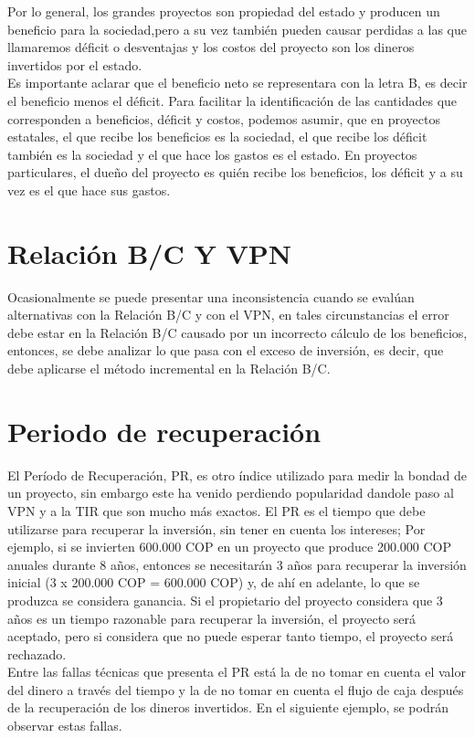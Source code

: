 Por lo general, los grandes proyectos son propiedad del estado y producen un beneficio para la sociedad,pero a su vez también pueden causar perdidas a las que llamaremos déficit  o desventajas y los costos del proyecto son los dineros invertidos por el estado.
\\
Es importante aclarar que el beneficio neto se representara con la letra B, es decir el beneficio menos el déficit. Para facilitar la identificación de las cantidades que corresponden a beneficios, déficit  y costos, podemos asumir, que en proyectos estatales, el que recibe los beneficios es la sociedad, el que recibe los déficit  también es la sociedad y el que hace los gastos es el estado. En proyectos particulares, el dueño del proyecto es quién recibe los beneficios, los déficit  y a su vez es el que hace sus gastos.
\\




\section{Relación B/C Y VPN}
Ocasionalmente se puede presentar una inconsistencia cuando se evalúan alternativas con la Relación B/C y con el VPN, en tales circunstancias el error debe estar en la Relación B/C causado por un incorrecto cálculo de los beneficios, entonces, se debe analizar lo que pasa con el exceso de inversión, es decir, que debe aplicarse el método incremental en la Relación B/C.
\\


\section{Periodo de recuperación}
El Período de Recuperación, PR, es otro índice utilizado para medir la bondad de un proyecto, sin embargo este ha venido perdiendo popularidad dandole paso al VPN y a la TIR que son mucho más exactos. El PR es el tiempo que debe utilizarse para recuperar la inversión, sin tener en cuenta los intereses; Por ejemplo, si se invierten 600.000 COP en un proyecto que produce 200.000 COP anuales durante 8 años, entonces se necesitarán 3 años para recuperar la inversión inicial (3 x 200.000 COP = 600.000 COP) y, de ahí en adelante, lo que se produzca se considera ganancia. Si el propietario del proyecto considera que 3 años es un tiempo razonable para recuperar la inversión, el proyecto será aceptado, pero si considera que no puede esperar tanto tiempo, el proyecto será rechazado.\\

Entre las fallas técnicas que presenta el PR está la de no tomar en cuenta el valor del dinero a través del tiempo y la de no tomar en cuenta el flujo de caja después de la recuperación de los dineros invertidos. En el siguiente ejemplo, se podrán observar estas fallas.\\


